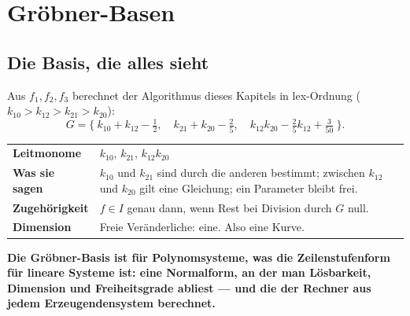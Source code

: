 \chapter{Gröbner-Basen}

\section{Die Basis, die alles sieht}

\begin{merksatz}
Aus $f_1, f_2, f_3$ berechnet der Algorithmus dieses Kapitels in lex-Ordnung ($k_{10} > k_{12} > k_{21} > k_{20}$):
\[ G = \bigl\{\ k_{10} + k_{12} - \tfrac12,\quad k_{21} + k_{20} - \tfrac25,\quad k_{12}k_{20} - \tfrac25k_{12} + \tfrac{3}{50}\ \bigr\} . \]
\begin{center}
{\small
\renewcommand{\arraystretch}{1.5}
\begin{tabular}{@{}P{3.6cm}P{5.0cm}@{}}
\toprule
\textbf{Leitmonome} & $k_{10}$, $k_{21}$, $k_{12}k_{20}$\\
\textbf{Was sie sagen} & $k_{10}$ und $k_{21}$ sind durch die anderen bestimmt; zwischen $k_{12}$ und $k_{20}$ gilt eine Gleichung; ein Parameter bleibt frei.\\
\textbf{Zugehörigkeit} & $f\in I$ genau dann, wenn Rest bei Division durch $G$ null.\\
\textbf{Dimension} & Freie Veränderliche: eine. Also eine Kurve.\\
\bottomrule
\end{tabular}}
\end{center}

\begin{center}
\begin{minipage}{0.9\textwidth}
\textbf{Die Gröbner-Basis ist für Polynomsysteme, was die Zeilenstufenform für lineare Systeme ist: eine Normalform, an der man Lösbarkeit, Dimension und Freiheitsgrade abliest --- und die der Rechner aus jedem Erzeugendensystem berechnet.}
\end{minipage}
\end{center}

\begin{center}
\begin{minipage}{0.88\textwidth}
\end{minipage}
\end{center}
\end{merksatz}

